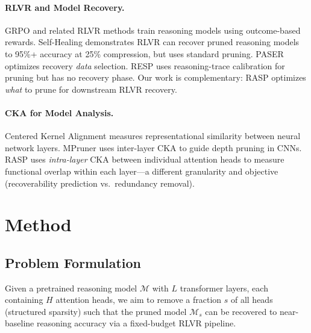 \documentclass[11pt]{article}
\begin{document}
\paragraph{RLVR and Model Recovery.}
GRPO \citep{deepseek2025r1} and related RLVR methods train reasoning models using outcome-based rewards.
Self-Healing \citep{selfhealing2025} demonstrates RLVR can recover pruned reasoning models to 95\%+ accuracy at 25\% compression, but uses standard pruning.
PASER \citep{paser2025} optimizes recovery \emph{data} selection.
RESP \citep{resp2025} uses reasoning-trace calibration for pruning but has no recovery phase.
Our work is complementary: RASP optimizes \emph{what} to prune for downstream RLVR recovery.

\paragraph{CKA for Model Analysis.}
Centered Kernel Alignment \citep{kornblith2019cka} measures representational similarity between neural network layers.
MPruner \citep{mpruner2024} uses inter-layer CKA to guide depth pruning in CNNs.
RASP uses \emph{intra-layer} CKA between individual attention heads to measure functional overlap within each layer---a different granularity and objective (recoverability prediction vs.\ redundancy removal).


\section{Method}
\label{sec:method}

\subsection{Problem Formulation}
Given a pretrained reasoning model $\mathcal{M}$ with $L$ transformer layers, each containing $H$ attention heads, we aim to remove a fraction $s$ of all heads (structured sparsity) such that the pruned model $\mathcal{M}_s$ can be recovered to near-baseline reasoning accuracy via a fixed-budget RLVR pipeline.
\end{document}
